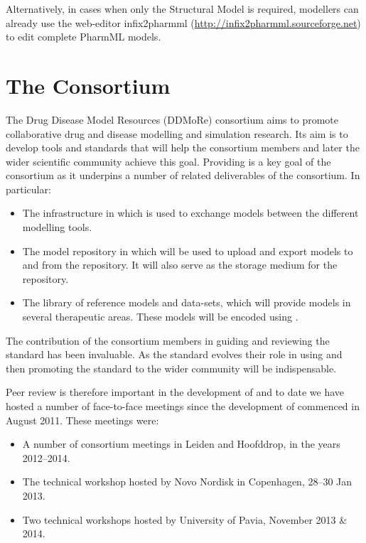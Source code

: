 Alternatively, in cases when only the Structural Model is required, modellers can 
already use the web-editor infix2pharmml (\url{http://infix2pharmml.sourceforge.net}) 
to edit complete PharmML models. 


\section{The \ddmore Consortium} 


The Drug Disease Model Resources (DDMoRe) consortium aims to promote collaborative drug and disease
modelling and simulation research. Its aim is to develop tools and standards that will help the
consortium members and later the wider scientific community achieve this goal. Providing \pharmml
is a key goal of the consortium as it underpins a number of related deliverables of the consortium.
In particular:

\begin{itemize}
\item The \ddmore infrastructure in which \pharmml is used to exchange models between the different modelling tools.
\item The \ddmore model repository in which \pharmml will be used to upload and export models to and from the repository. It will also serve as the storage medium for the repository.
\item The \ddmore library of reference models and data-sets, which will provide models in several therapeutic areas. These models will be encoded using \pharmml.
\end{itemize}

The contribution of the \ddmore consortium members in guiding and reviewing the standard 
has been invaluable. As the standard evolves their role in using and then promoting the 
standard to the wider community will be indispensable.

Peer review is therefore important in the development of \pharmml and to date we have 
hosted a number of face-to-face meetings since the development of \pharmml 
commenced in August 2011. These meetings were:

\begin{itemize}
\item A number of \ddmore consortium meetings in Leiden and Hoofddrop, in the years 2012--2014.
\item The \ddmore technical workshop hosted by Novo Nordisk in Copenhagen, 28--30 Jan 2013.
\item Two \pml technical workshops hosted by University of Pavia, November 2013 \& 2014.
\end{itemize}

